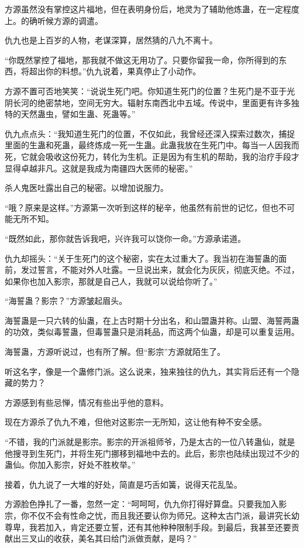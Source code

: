 \begin{this_body}
方源虽然没有掌控这片福地，但在表明身份后，地灵为了辅助他炼蛊，在一定程度上。的确听候方源的调遣。

仇九也是上百岁的人物，老谋深算，居然猜的八九不离十。

“你既然掌控了福地，那我就不做这无用功了。只要你留我一命，你所得到的东西，将超出你的料想。”仇九说着，果真停止了小动作。

方源不置可否地笑笑：“说说生死门吧。你知道生死门的位置？生死门是不亚于光阴长河的绝密禁地，空间无穷大。辐射东南西北中五域。传说中，里面更有许多独特的天然蛊虫，譬如生蛊、死蛊等。”

仇九点点头：“我知道生死门的位置，不仅如此，我曾经还深入探索过数次，捕捉里面的生蛊和死蛊，最终炼成一死一生蛊。此蛊我放在生死门中。每当一人因我而死，它就会吸收这份死力，转化为生机。正是因为有生机的帮助，我的治疗手段才显得卓越非凡。这就是我成为南疆四大医师的秘密。”

杀人鬼医吐露出自己的秘密。以增加说服力。

“哦？原来是这样。”方源第一次听到这样的秘辛，他虽然有前世的记忆，但也不可能无所不知。

“既然如此，那你就告诉我吧，兴许我可以饶你一命。”方源承诺道。

仇九却摇头：“关于生死门的这个秘密，实在太过重大了。我当初在海誓蛊的面前，发过誓言，不能对外人吐露。一旦说出来，就会化为灰灰，彻底灭绝。不过，如果你也加入影宗，那就是自己人，我就可以说给你听了。”

“海誓蛊？影宗？”方源皱起眉头。

海誓蛊是一只六转的仙蛊，在上古时期十分出名，和山盟蛊并称。山盟、海誓两蛊的功效，类似毒誓蛊，但毒誓蛊只是消耗品，而这两个仙蛊，却是可以重复运用。

海誓蛊，方源听说过，也有所了解。但“影宗”方源就陌生了。

听这名字，像是一个蛊修门派。这么说来，独来独往的仇九，其实背后还有一个隐藏的势力？

方源感到有些忌惮，情况有些出乎他的意料。

现在方源杀了仇九不难，但他对这影宗一无所知，这让他有种不安全感。

“不错，我的门派就是影宗。影宗的开派祖师爷，乃是太古的一位八转蛊仙，就是他搜寻到生死门，并将生死门挪移到福地中去的。此后，影宗也陆续出现过不少的蛊仙。你加入影宗，好处不胜枚举。”

接着，仇九说了一大堆的好处，简直是巧舌如簧，说得天花乱坠。

方源脸色挣扎了一番，忽然一定：“呵呵呵，仇九你打得好算盘。只要我加入影宗，你不仅不会有性命之忧，而且我还要认你为师兄。这种太古门派，最讲究长幼尊卑，我若加入，肯定还要立誓，还有其他种种限制手段。到最后，我甚至还要贡献出三叉山的收获，美名其曰给门派做贡献，是吗？”


\end{this_body}
